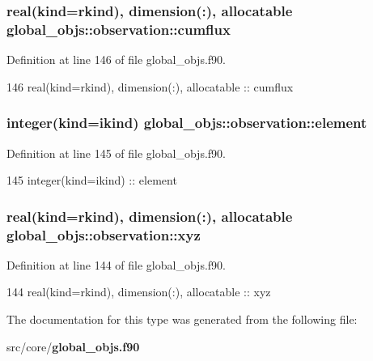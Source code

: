 \subsubsection[{cumflux}]{\setlength{\rightskip}{0pt plus 5cm}real(kind=rkind), dimension(\+:), allocatable global\+\_\+objs\+::observation\+::cumflux}\label{structglobal__objs_1_1observation_a6ef78bcf13d24def2235dfad392a2d51}


Definition at line 146 of file global\+\_\+objs.\+f90.


\begin{DoxyCode}
146     \textcolor{keywordtype}{real(kind=rkind)}, \textcolor{keywordtype}{dimension(:)}, \textcolor{keywordtype}{allocatable} :: cumflux
\end{DoxyCode}
\subsubsection[{element}]{\setlength{\rightskip}{0pt plus 5cm}integer(kind=ikind) global\+\_\+objs\+::observation\+::element}\label{structglobal__objs_1_1observation_a04c48dcee5ffc69d77b2d57946e7d495}


Definition at line 145 of file global\+\_\+objs.\+f90.


\begin{DoxyCode}
145     \textcolor{keywordtype}{integer(kind=ikind)} :: element
\end{DoxyCode}
\subsubsection[{xyz}]{\setlength{\rightskip}{0pt plus 5cm}real(kind=rkind), dimension(\+:), allocatable global\+\_\+objs\+::observation\+::xyz}\label{structglobal__objs_1_1observation_acb3a200f6d4374ae78c157ba869c6e3e}


Definition at line 144 of file global\+\_\+objs.\+f90.


\begin{DoxyCode}
144     \textcolor{keywordtype}{real(kind=rkind)}, \textcolor{keywordtype}{dimension(:)}, \textcolor{keywordtype}{allocatable} :: xyz
\end{DoxyCode}


The documentation for this type was generated from the following file\+:\begin{DoxyCompactItemize}
\item 
src/core/{\bf global\+\_\+objs.\+f90}\end{DoxyCompactItemize}

